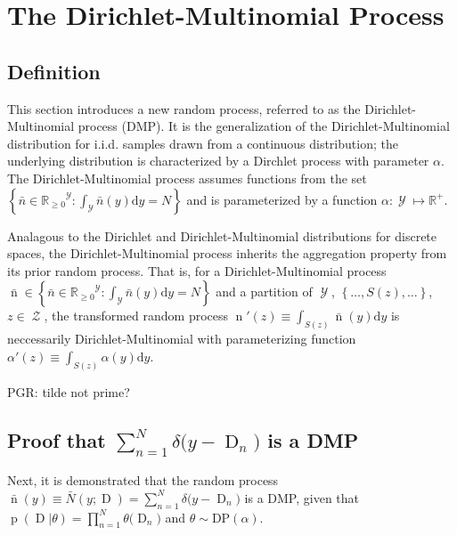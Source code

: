 \documentclass[12pt]{report}
\DeclareMathOperator{\Drm}{\mathrm{D}}
\DeclareMathOperator{\nrm}{\mathrm{n}}
\DeclareMathOperator{\prm}{\mathrm{p}}
\DeclareMathOperator{\Ycal}{\mathcal{Y}}
\DeclareMathOperator{\Zcal}{\mathcal{Z}}
\begin{document}
\section{The Dirichlet-Multinomial Process} \label{app:DMP}

\subsection{Definition}

This section introduces a new random process, referred to as the Dirichlet-Multinomial process (DMP). It is the generalization of the Dirichlet-Multinomial distribution for i.i.d. samples drawn from a continuous distribution; the underlying distribution is characterized by a Dirchlet process with parameter $\alpha$. The Dirichlet-Multinomial process assumes functions from the set $\left\{ \bar{n} \in {\mathbb{R}_{\geq 0}}^{\Ycal} : \int_{\Ycal} \bar{n}(y) \mathrm{d} y = N \right\}$ and is parameterized by a function $\alpha : \Ycal \mapsto \mathbb{R}^+$.

Analagous to the Dirichlet and Dirichlet-Multinomial distributions for discrete spaces, the Dirichlet-Multinomial process inherits the aggregation property from its prior random process. That is, for a Dirichlet-Multinomial process $\bar{\nrm} \in \left\{ \bar{n} \in {\mathbb{R}_{\geq 0}}^{\Ycal} : \int_{\Ycal} \bar{n}(y) \mathrm{d} y = N \right\}$ and a partition of $\Ycal$, $\left\{ \ldots,S(z),\ldots \right\}$, $z \in \Zcal$, the transformed random process $\nrm'(z) \equiv \int_{S(z)} \bar{\nrm}(y) \mathrm{d} y$ is neccessarily Dirichlet-Multinomial with parameterizing function $\alpha'(z) \equiv \int_{S(z)} \alpha(y) \mathrm{d} y$.

PGR: tilde not prime?

\subsection{Proof that $\sum_{n=1}^N \delta\big( y-\Drm_n \big)$ is a DMP}

Next, it is demonstrated that the random process $\bar{\nrm}(y) \equiv \bar{N}(y;\Drm) = \sum_{n=1}^N \delta\big( y-\Drm_n \big)$ is a DMP, given that $\prm(\Drm|\theta) = \prod_{n=1}^N \theta\big( \Drm_n \big)$ and $\theta \sim \mathrm{DP}(\alpha)$. 
\end{document}
